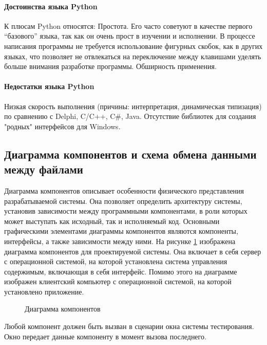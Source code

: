 \paragraph{Достоинства языка Python}

К плюсам Python относятся: Простота. Его часто советуют в качестве первого “базового” языка, так как он очень прост в изучении и исполнении. В процессе написания программы не требуется использование фигурных скобок, как в других языках, что позволяет не отвлекаться на переключение между клавишами уделять больше внимания разработке программы. Обширность применения.

\paragraph{Недостатки языка Python}

Низкая скорость выполнения (причины: интерпретация, динамическая типизация) по сравнению с Delphi, C/C++, C\#, Java.
Отсутствие библиотек для создания "родных" интерфейсов для Windows.

\subsection{Диаграмма компонентов и схема обмена данными между файлами}

Диаграмма компонентов описывает особенности физического представления разрабатываемой системы. Она позволяет определить архитектуру системы, установив зависимости между программными компонентами, в роли которых может выступать как исходный, так и исполняемый код. Основными графическими элементами диаграммы компонентов являются компоненты, интерфейсы, а также зависимости между ними. На рисунке \ref{system_template:image} изображена диаграмма компонентов для проектируемой системы. Она включает в себя сервер с операционной системой, на которой установлена система управления содержимым, включающая в себя интерфейс. Помимо этого на диаграмме изображен клиентский компьютер с операционной системой, на которой установлено приложение.

\begin{figure}[ht]
\caption{Диаграмма компонентов}
\label{system_template:image}
\end{figure}

Любой компонент должен быть вызван в сценарии окна системы тестирования. Окно передает данные компоненту в момент вызова последнего.

